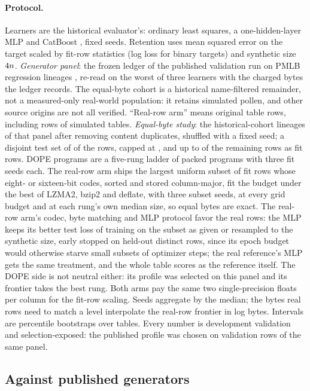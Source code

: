 \documentclass{article}
\theoremstyle{remark}
\begin{document}
\paragraph{Protocol.} Learners are the historical evaluator's: ordinary least squares, a one-hidden-layer
MLP and CatBoost \citep{prokhorenkova2018catboost}, fixed seeds. Retention uses mean squared error on the
target scaled by fit-row statistics (log loss for binary targets) and synthetic size $4n$.
\emph{Generator panel}: the frozen ledger of the published validation run on PMLB regression lineages
\citep{olson2017pmlb,romano2021pmlb}, re-read on the worst of three learners with the charged bytes the
ledger records. The equal-byte cohort is a historical name-filtered remainder, not a measured-only
real-world population: it retains simulated pollen, and other source origins are not all verified.
``Real-row arm'' means original table rows, including rows of simulated tables.
\emph{Equal-byte study}: the \EbLineages{} historical-cohort lineages of that panel after removing
content duplicates, shuffled with a fixed seed; a disjoint test set of \cTestShare{} of the rows, capped at
\cFitCap{}, and up to \cFitCap{} of the remaining rows as fit rows. DOPE programs are a five-rung ladder of
packed programs with three fit seeds each. The real-row arm ships the largest uniform subset of fit rows
whose eight- or sixteen-bit codes, sorted and stored column-major, fit the budget under the best of LZMA2,
bzip2 and deflate, with three subset seeds, at every grid budget and at each rung's own median size, so
equal bytes are exact. The real-row arm's codec, byte matching and MLP protocol favor the real rows: the MLP
keeps its better test loss of training on the subset as given or resampled to the synthetic size, early
stopped on held-out distinct rows, since its epoch budget would otherwise starve small subsets of optimizer
steps; the real reference's MLP gets the same treatment, and the whole table scores as the reference
itself. The DOPE side is not neutral either: its profile was selected on this panel and its frontier takes
the best rung. Both arms pay the same two single-precision floats per
column for the fit-row scaling. Seeds aggregate by the median; the bytes real rows need to match a level
interpolate the real-row frontier in log bytes. Intervals are percentile bootstraps over tables. Every number is development validation and
selection-exposed: the published profile was chosen on validation rows of the same panel.

\subsection{Against published generators}
\end{document}
